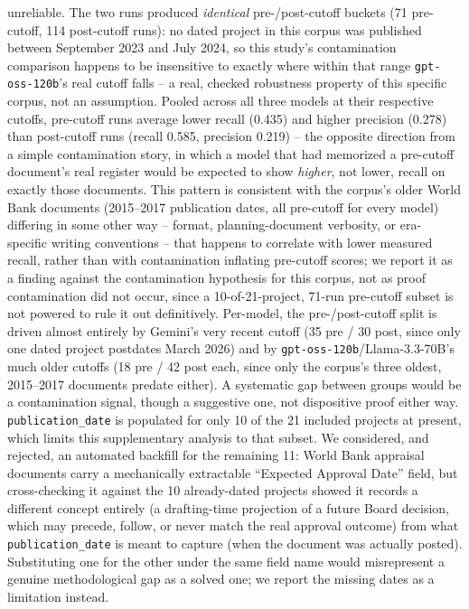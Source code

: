 \documentclass[conference]{IEEEtran}
\begin{document}
unreliable. The two runs produced \emph{identical} pre-/post-cutoff buckets
(71 pre-cutoff, 114 post-cutoff runs): no dated project in this corpus was
published between September 2023 and July 2024, so this study's contamination
comparison happens to be insensitive to exactly where within that range
\texttt{gpt-oss-120b}'s real cutoff falls -- a real, checked robustness
property of this specific corpus, not an assumption. Pooled across all three
models at their respective cutoffs, pre-cutoff runs average lower recall
(0.435) and higher precision (0.278) than post-cutoff runs (recall 0.585,
precision 0.219) -- the opposite direction from a simple contamination story,
in which a model that had memorized a pre-cutoff document's real register
would be expected to show \emph{higher}, not lower, recall on exactly those
documents. This pattern is consistent with the corpus's older World Bank
documents (2015--2017 publication dates, all pre-cutoff for every model)
differing in some other way -- format, planning-document verbosity, or era-
specific writing conventions -- that happens to correlate with lower
measured recall, rather than with contamination inflating pre-cutoff scores;
we report it as a finding against the contamination hypothesis for this
corpus, not as proof contamination did not occur, since a 10-of-21-project,
71-run pre-cutoff subset is not powered to rule it out definitively.
Per-model, the pre-/post-cutoff split is driven almost entirely by
Gemini's very recent cutoff (35 pre / 30 post, since only one dated project
postdates March 2026) and by \texttt{gpt-oss-120b}/Llama-3.3-70B's much
older cutoffs (18 pre / 42 post each, since only the corpus's three
oldest, 2015--2017 documents predate either). A systematic gap
between groups would be a contamination signal, though a suggestive one,
not dispositive proof either way. \texttt{publication\_date} is populated
for only 10 of the 21 included projects at present, which limits this
supplementary analysis to that subset. We considered, and rejected, an
automated backfill for the remaining 11: World Bank appraisal documents
carry a mechanically extractable ``Expected Approval Date'' field, but
cross-checking it against the 10 already-dated projects showed it records a
different concept entirely (a drafting-time projection of a future Board
decision, which may precede, follow, or never match the real approval
outcome) from what \texttt{publication\_date} is meant to capture (when the
document was actually posted). Substituting one for the other under the
same field name would misrepresent a genuine methodological gap as a solved
one; we report the missing dates as a limitation instead.
\end{document}
